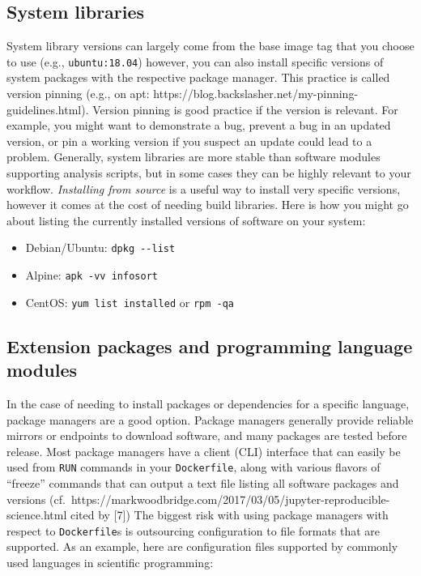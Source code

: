 \documentclass[10pt,letterpaper]{article}
\providecommand{\tightlist}{%
  \setlength{\itemsep}{0pt}\setlength{\parskip}{0pt}}
\begin{document}
\hypertarget{system-libraries}{%
\subsection{System libraries}\label{system-libraries}}

System library versions can largely come from the base image tag that
you choose to use (e.g., \texttt{ubuntu:18.04}) however, you can also
install specific versions of system packages with the respective package
manager. This practice is called version pinning (e.g., on apt:
https://blog.backslasher.net/my-pinning-guidelines.html). Version
pinning is good practice if the version is relevant. For example, you
might want to demonstrate a bug, prevent a bug in an updated version, or
pin a working version if you suspect an update could lead to a problem.
Generally, system libraries are more stable than software modules
supporting analysis scripts, but in some cases they can be highly
relevant to your workflow. \emph{Installing from source} is a useful way
to install very specific versions, however it comes at the cost of
needing build libraries. Here is how you might go about listing the
currently installed versions of software on your system:

\begin{itemize}
\tightlist
\item
  Debian/Ubuntu: \texttt{dpkg\ -\/-list}
\item
  Alpine: \texttt{apk\ -vv\ info\textbar{}sort}
\item
  CentOS: \texttt{yum\ list\ installed} or \texttt{rpm\ -qa}
\end{itemize}

\hypertarget{extension-packages-and-programming-language-modules}{%
\subsection{Extension packages and programming language
modules}\label{extension-packages-and-programming-language-modules}}

In the case of needing to install packages or dependencies for a
specific language, package managers are a good option. Package managers
generally provide reliable mirrors or endpoints to download software,
and many packages are tested before release. Most package managers have
a client (CLI) interface that can easily be used from \texttt{RUN}
commands in your \texttt{Dockerfile}, along with various flavors of
``freeze'' commands that can output a text file listing all software
packages and versions
(cf.~https://markwoodbridge.com/2017/03/05/jupyter-reproducible-science.html
cited by {[}7{]}) The biggest risk with using package managers with
respect to \texttt{Dockerfile}s is outsourcing configuration to file
formats that are supported. As an example, here are configuration files
supported by commonly used languages in scientific programming:
\end{document}
